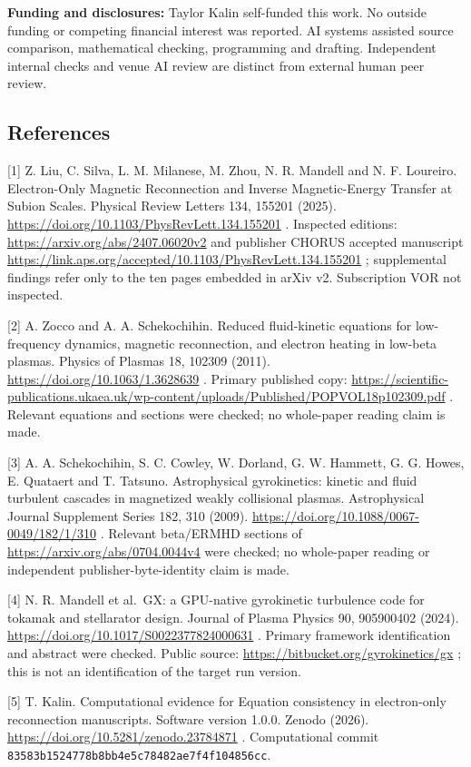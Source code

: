 \textbf{Funding and disclosures:} Taylor Kalin self-funded this work. No
outside funding or competing financial interest was reported. AI systems
assisted source comparison, mathematical checking, programming and
drafting. Independent internal checks and venue AI review are distinct
from external human peer review.

\clearpage
\begingroup\small\raggedright
\subsection{References}\label{references}

{[}1{]} Z. Liu, C. Silva, L. M. Milanese, M. Zhou, N. R. Mandell and N.
F. Loureiro. Electron-Only Magnetic Reconnection and Inverse
Magnetic-Energy Transfer at Subion Scales. Physical Review Letters 134,
155201 (2025). \url{https://doi.org/10.1103/PhysRevLett.134.155201} .
Inspected editions: \url{https://arxiv.org/abs/2407.06020v2} and
publisher CHORUS accepted manuscript
\url{https://link.aps.org/accepted/10.1103/PhysRevLett.134.155201} ;
supplemental findings refer only to the ten pages embedded in arXiv v2.
Subscription VOR not inspected.

{[}2{]} A. Zocco and A. A. Schekochihin. Reduced fluid-kinetic equations
for low-frequency dynamics, magnetic reconnection, and electron heating
in low-beta plasmas. Physics of Plasmas 18, 102309 (2011).
\url{https://doi.org/10.1063/1.3628639} . Primary published copy:
\url{https://scientific-publications.ukaea.uk/wp-content/uploads/Published/POPVOL18p102309.pdf}
. Relevant equations and sections were checked; no whole-paper reading
claim is made.

{[}3{]} A. A. Schekochihin, S. C. Cowley, W. Dorland, G. W. Hammett, G.
G. Howes, E. Quataert and T. Tatsuno. Astrophysical gyrokinetics:
kinetic and fluid turbulent cascades in magnetized weakly collisional
plasmas. Astrophysical Journal Supplement Series 182, 310 (2009).
\url{https://doi.org/10.1088/0067-0049/182/1/310} . Relevant beta/ERMHD
sections of \url{https://arxiv.org/abs/0704.0044v4} were checked; no
whole-paper reading or independent publisher-byte-identity claim is
made.

{[}4{]} N. R. Mandell et al.~GX: a GPU-native gyrokinetic turbulence
code for tokamak and stellarator design. Journal of Plasma Physics 90,
905900402 (2024). \url{https://doi.org/10.1017/S0022377824000631} .
Primary framework identification and abstract were checked. Public
source: \url{https://bitbucket.org/gyrokinetics/gx} ; this is not an
identification of the target run version.

{[}5{]} T. Kalin. Computational evidence for Equation consistency in
electron-only reconnection manuscripts. Software version 1.0.0. Zenodo
(2026). \url{https://doi.org/10.5281/zenodo.23784871} . Computational
commit \nolinkurl{83583b1524778b8bb4e5c78482ae7f4f104856cc}.

\endgroup
